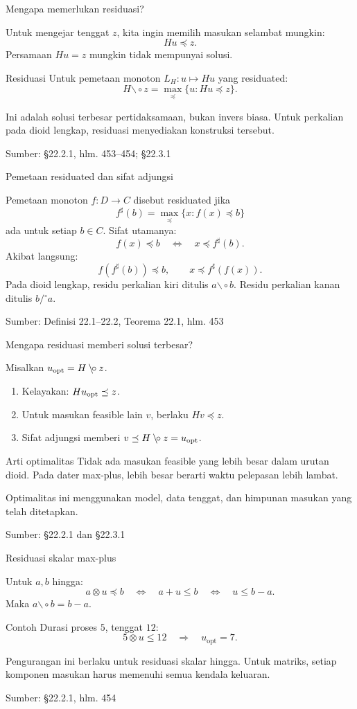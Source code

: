 \documentclass[aspectratio=169,11pt]{beamer}
\newcommand{\source}[1]{%
    \vfill
    \hfill{\tiny\color{gray}Sumber: #1}
}
\newcommand{\res}{\mathbin{\backslash\!\circ}}
\begin{document}
\begin{frame}{Mengapa memerlukan residuasi?}


Untuk mengejar tenggat $z$, kita ingin memilih masukan selambat mungkin:
\[
Hu\preceq z.
\]
Persamaan $Hu=z$ mungkin tidak mempunyai solusi.
\begin{block}{Residuasi}
Untuk pemetaan monoton $L_H:u\mapsto Hu$ yang residuated:
\[
H\res z=\max_{\preceq}\{u:Hu\preceq z\}.
\]
\end{block}
Ini adalah solusi terbesar pertidaksamaan, bukan invers biasa.
Untuk perkalian pada dioid lengkap, residuasi menyediakan konstruksi tersebut.

\source{\S22.2.1, hlm. 453--454; \S22.3.1}

\end{frame}
\begin{frame}{Pemetaan residuated dan sifat adjungsi}

Pemetaan monoton $f:D\to C$ disebut residuated jika
\[
f^\sharp(b)=\max_{\preceq}\{x:f(x)\preceq b\}
\]
ada untuk setiap $b\in C$.
Sifat utamanya:
\[
f(x)\preceq b\quad\Longleftrightarrow\quad x\preceq f^\sharp(b).
\]
Akibat langsung:
\[
f(f^\sharp(b))\preceq b,\qquad x\preceq f^\sharp(f(x)).
\]
Pada dioid lengkap, residu perkalian kiri ditulis $a\res b$.
Residu perkalian kanan ditulis $b/\!^\circ a$.

\source{Definisi 22.1--22.2, Teorema 22.1, hlm. 453}
\end{frame}
\begin{frame}{Mengapa residuasi memberi solusi terbesar?}

Misalkan $u_{\rm opt}=H\res z$.
\begin{enumerate}
\item Kelayakan: $Hu_{\rm opt}\preceq z$.
\item Untuk masukan feasible lain $v$, berlaku $Hv\preceq z$.
\item Sifat adjungsi memberi $v\preceq H\res z=u_{\rm opt}$.
\end{enumerate}
\begin{block}{Arti optimalitas}
Tidak ada masukan feasible yang lebih besar dalam urutan dioid.
Pada dater max-plus, lebih besar berarti waktu pelepasan lebih lambat.
\end{block}
Optimalitas ini menggunakan model, data tenggat, dan himpunan masukan yang telah ditetapkan.

\source{\S22.2.1 dan \S22.3.1}
\end{frame}
\begin{frame}{Residuasi skalar max-plus}


Untuk $a,b$ hingga:
\[
a\otimes u\preceq b
\quad\Longleftrightarrow\quad
a+u\le b
\quad\Longleftrightarrow\quad
u\le b-a.
\]
Maka $a\res b=b-a$.
\begin{exampleblock}{Contoh}
Durasi proses $5$, tenggat $12$:
\[
5\otimes u\le12\quad\Longrightarrow\quad u_{\mathrm{opt}}=7.
\]
\end{exampleblock}
Pengurangan ini berlaku untuk residuasi skalar hingga.
Untuk matriks, setiap komponen masukan harus memenuhi semua kendala keluaran.

\source{\S22.2.1, hlm. 454}

\end{frame}
\end{document}

